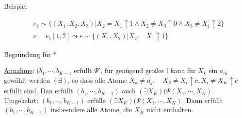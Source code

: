\documentclass[12pt, a4paper]{article}
\begin{document}
Beispiel

\begin{align*}
& e_1 \sim \{ (X_1, X_2, X_3) | X_2 = X_1 \uparrow 1 \wedge X_2 \neq X_3 \uparrow 0 \wedge X_3 \neq X_1 \uparrow 2 \} \\
& e = e_1[1,2] \leadsto e \sim \{ (X_1, X_2) | X_2 = X_1 \uparrow 1 \}
\end{align*}

Begründung für * 

\underline{Annahme}: $(b_1, \cdots, b_{K-1}$ erfüllt $\Psi'$, für genügend großes l kann für $X_k$ ein $a_m$ gewählt werden $(\exists)$, so dass alle Atome $X_k \neq a_j, \quad X_k \neq X_i \uparrow c, X_i \neq X_K \uparrow c$ erfüllt sind. Dan erfüllt $(b_1, \cdots, b_{K - 1})$ auch $(\exists X_K)(\Psi(X_1, \cdots, X_K)$. \\
Umgekehrt: $(b_1, \cdots, b_{K - 1})$ erfülle $(\exists X_K)(\Psi(X_1, \cdots, X_K)$. Dann erfüllt $(b_1, \cdots, b_{K - 1})$ insbesndere alle Atome, die $X_K$ nicht enthalten.
\end{document}
